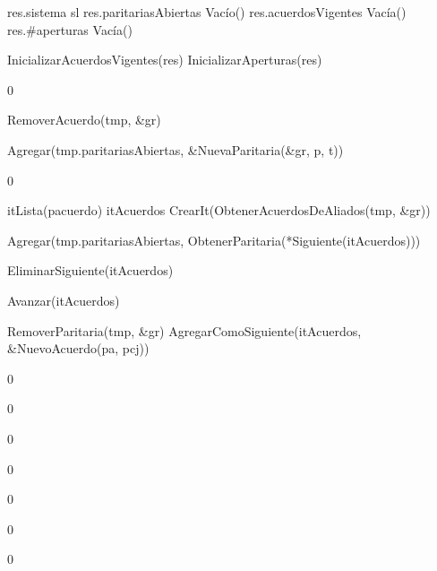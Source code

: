 {
	\state res.sistema \asig sl
	\state res.paritariasAbiertas \asig Vacío()
	\state res.acuerdosVigentes \asig Vacía()
	\state res.\#aperturas \asig Vacía()
	\state

	\state InicializarAcuerdosVigentes(res)
	\state InicializarAperturas(res)
}
{0}

{
		\state RemoverAcuerdo(tmp, \&gr)
	\endif
	\state

	\state Agregar(tmp.paritariasAbiertas, \&NuevaParitaria(\&gr, p, t))
}
{0}

{

	\state itLista(pacuerdo) itAcuerdos \asig CrearIt(ObtenerAcuerdosDeAliados(tmp, \&gr))
		\state

		\state Agregar(tmp.paritariasAbiertas, ObtenerParitaria(*Siguiente(itAcuerdos)))

		\state EliminarSiguiente(itAcuerdos)

		\state
		\state Avanzar(itAcuerdos)
	\endwhile
	\state

	\state {} \asig RemoverParitaria(tmp, \&gr)
	\state AgregarComoSiguiente(itAcuerdos, \&NuevoAcuerdo(pa, pcj))
}
{0}

{
	
}
{0}

{
	
}
{0}

{
	
}
{0}

{
	
}
{0}

{
	
}
{0}

{
	
}
{0}


